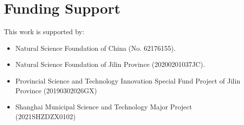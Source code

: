 \documentclass[10pt,twocolumn,letterpaper]{article}
\begin{document}
{\section{Funding Support}
\label{sec:supp_fund}
This work is supported by:
\begin{itemize}
    \item Natural Science Foundation of China (No. 62176155).
    \item Natural Science Foundation of Jilin Province (20200201037JC).
    \item Provincial Science and Technology Innovation Special Fund Project of Jilin Province (20190302026GX)
    \item Shanghai Municipal Science and Technology Major Project (2021SHZDZX0102)
\end{itemize}


}
\end{document}
